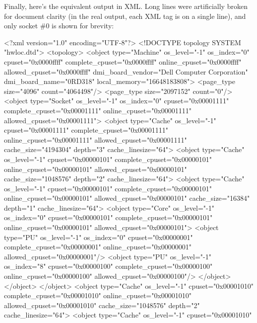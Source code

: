 Finally, here's the equivalent output in XML. Long lines were artificially broken for document clarity (in the real output, each XML tag is on a single line), and only socket \#0 is shown for brevity:

\begin{DoxyVerb}
<?xml version="1.0" encoding="UTF-8"?>
<!DOCTYPE topology SYSTEM "hwloc.dtd">
<topology>
  <object type="Machine" os_level="-1" os_index="0" cpuset="0x0000ffff" 
      complete_cpuset="0x0000ffff" online_cpuset="0x0000ffff" 
      allowed_cpuset="0x0000ffff" 
      dmi_board_vendor="Dell Computer Corporation" dmi_board_name="0RD318" 
      local_memory="16648183808">
    <page_type size="4096" count="4064498"/>
    <page_type size="2097152" count="0"/>
    <object type="Socket" os_level="-1" os_index="0" cpuset="0x00001111" 
        complete_cpuset="0x00001111" online_cpuset="0x00001111" 
        allowed_cpuset="0x00001111">
      <object type="Cache" os_level="-1" cpuset="0x00001111" 
          complete_cpuset="0x00001111" online_cpuset="0x00001111" 
          allowed_cpuset="0x00001111" cache_size="4194304" depth="3" 
          cache_linesize="64">
        <object type="Cache" os_level="-1" cpuset="0x00000101" 
            complete_cpuset="0x00000101" online_cpuset="0x00000101" 
            allowed_cpuset="0x00000101" cache_size="1048576" depth="2" 
            cache_linesize="64">
          <object type="Cache" os_level="-1" cpuset="0x00000101" 
              complete_cpuset="0x00000101" online_cpuset="0x00000101" 
              allowed_cpuset="0x00000101" cache_size="16384" depth="1" 
              cache_linesize="64">
            <object type="Core" os_level="-1" os_index="0" cpuset="0x00000101" 
                complete_cpuset="0x00000101" online_cpuset="0x00000101" 
                allowed_cpuset="0x00000101">
              <object type="PU" os_level="-1" os_index="0" cpuset="0x00000001" 
                  complete_cpuset="0x00000001" online_cpuset="0x00000001" 
                  allowed_cpuset="0x00000001"/>
              <object type="PU" os_level="-1" os_index="8" cpuset="0x00000100" 
                  complete_cpuset="0x00000100" online_cpuset="0x00000100" 
                  allowed_cpuset="0x00000100"/>
            </object>
          </object>
        </object>
        <object type="Cache" os_level="-1" cpuset="0x00001010" 
            complete_cpuset="0x00001010" online_cpuset="0x00001010" 
            allowed_cpuset="0x00001010" cache_size="1048576" depth="2" 
            cache_linesize="64">
          <object type="Cache" os_level="-1" cpuset="0x00001010" 

\end{DoxyVerb}
